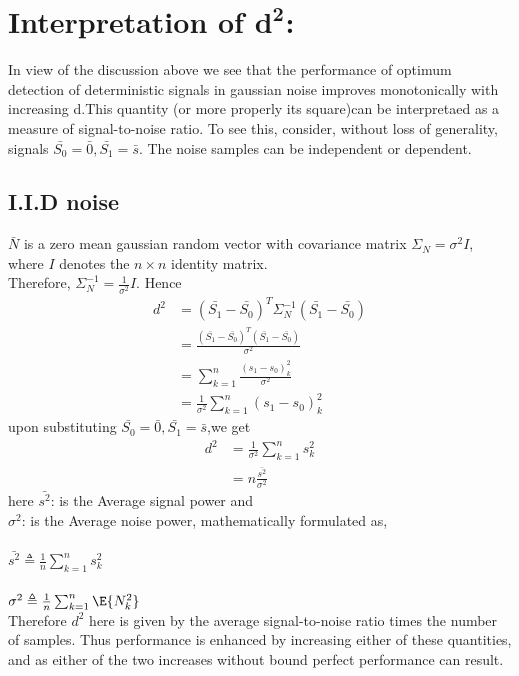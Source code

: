 \documentclass[12pt]{report}
\begin{document}
\section{Interpretation of $\mathbf{d^2}$:}
In view of the discussion above we see that the performance of optimum detection of deterministic signals in gaussian noise improves monotonically with increasing d.This quantity (or more properly its square)can be interpretaed as a measure of signal-to-noise ratio. To see this, consider, without loss of generality,
signals $\bar{S_0}=\bar{0},\bar{S_1}=\bar{s}$. The noise samples can be independent or dependent.
\subsection{I.I.D noise} $\bar{N}$ is a zero mean gaussian random vector with covariance matrix $\varSigma_N =\sigma^2I $, where $I$ denotes the $n\times n$ identity matrix.\\Therefore,  $\varSigma_N^{-1}= \frac{1}{\sigma^2}I$. Hence
\begin{align*}d^2&=(\bar{S_1}-\bar{S_0})^T\varSigma_{N}^{-1}(\bar{S_1}-\bar{S_0})\\&=\frac{(\bar{S_1}-\bar{S_0})^T(\bar{S_1}-\bar{S_0})}{\sigma^2}\\&=\sum_{k=1}^{n}\frac{(s_1-s_0)^2_k}{\sigma^2}\\&=\frac{1}{\sigma^2}\sum_{k=1}^{n}(s_1-s_0)^2_k\end{align*}  upon substituting  $\bar{S_0}=\bar{0},\bar{S_1}=\bar{s}$,we get \\
\begin{align*}
d^2&=\frac{1}{\sigma^2}\sum_{k=1}^{n}s^2_k\\ &=n\frac{\bar{s^2}}{\sigma^2}
\end{align*}
here $\bar{s^2}$: is the Average signal power and  \\ \indent $\sigma^2$: is the Average noise power,  mathematically formulated as,\\ \\
\indent $\bar{s^2}\triangleq\frac{1}{n}\sum_{k=1}^{n}s^2_k $\\ \\
\indent $\sigma^2\triangleq\frac{1}{n}\sum_{k=1}^{n}\E{N^2_k}$
\\Therefore $d^2$ here is given by the average signal-to-noise ratio times the number of samples. Thus performance is enhanced by increasing either of these quantities, and as either of the two increases without bound perfect performance can result.
\end{document}
